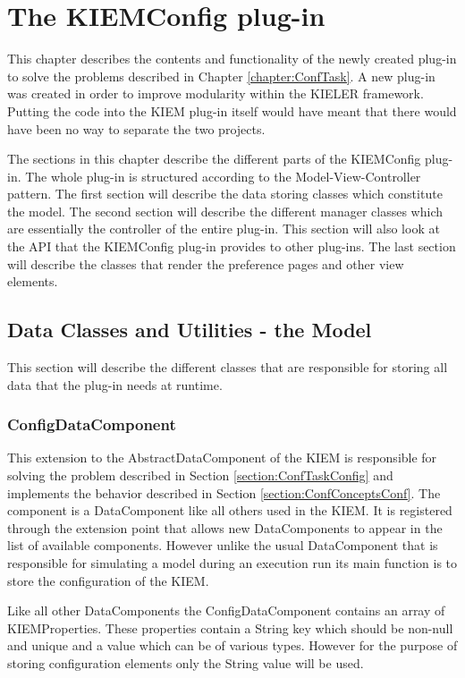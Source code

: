 \chapter{The KIEMConfig plug-in}
\label{chapter:KiemConfig}
This chapter describes the contents and functionality of the newly created
plug-in to solve the problems described in Chapter \ref{chapter:ConfTask}.
A new plug-in was created in order to improve modularity within the \ac{KIELER} framework.
Putting the code into the \ac{KIEM} plug-in itself would have meant that
there would have been no way to separate the two projects.

The sections in this chapter describe the different parts of the \ac{KIEMConfig} plug-in.
The whole plug-in is structured according to the Model-View-Controller pattern.
The first section will describe the data storing classes which constitute the model.
The second section will describe the different manager classes which are essentially the
controller of the entire plug-in. This section will also look at the \ac{API} that the
\ac{KIEMConfig} plug-in provides to other plug-ins.
The last section will describe the classes that render the preference pages and other
view elements.

\section{Data Classes and Utilities - the Model}
\label{section:ConfModel}
This section will describe the different classes that are responsible for storing all
data that the plug-in needs at runtime.


\subsection{ConfigDataComponent}
\label{section:ConfigDataComponent}
This extension to the AbstractDataComponent of the \ac{KIEM} is responsible for solving
the problem described in Section \ref{section:ConfTaskConfig} and implements the behavior
described in Section \ref{section:ConfConceptsConf}. The component is a DataComponent
like all others used in the \ac{KIEM}. It is registered through the extension point
that allows new DataComponents to appear in the list of available components.
However unlike the usual DataComponent that is responsible for simulating a model during
an execution run its main function is to store the configuration of the \ac{KIEM}.

Like all other DataComponents the ConfigDataComponent contains an array of
KIEMProperties. These properties contain a String key which should be non-null and unique and 
a value which can be of various types. However for the purpose of storing configuration
elements only the String value will be used.

